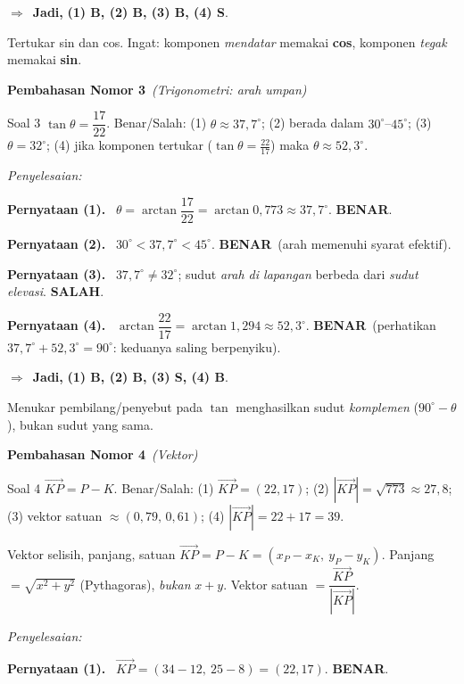 \documentclass[11pt,a4paper]{article}
\newcommand{\jawab}{\par\smallskip\noindent\textit{\textcolor{oranye}{Penyelesaian:}}\par\smallskip}
\newcommand{\jadi}{\par\smallskip\noindent$\Rightarrow$\ \textbf{Jadi, }}
\newcommand{\benar}{\textbf{\textcolor{hijau}{BENAR}}}
\newcommand{\salah}{\textbf{\textcolor{merah}{SALAH}}}
\newcommand{\pernyataan}[1]{\par\smallskip\noindent\textbf{Pernyataan (#1).}\ }
\newcommand{\nomorjudul}[2]{\par\bigskip\noindent%
  {\large\bfseries\color{ungu}Pembahasan Nomor #1}\ {\normalfont\itshape\color{gray}(#2)}\par\nopagebreak\smallskip}
\begin{document}
\jadi \textbf{(1) B, (2) B, (3) B, (4) S}.

\begin{jebakan}
Tertukar sin dan cos. Ingat: komponen \emph{mendatar} memakai \textbf{cos},
komponen \emph{tegak} memakai \textbf{sin}.
\end{jebakan}

\nomorjudul{3}{Trigonometri: arah umpan}
\begin{soalbox}{Soal 3}
$\tan\theta=\dfrac{17}{22}$. Benar/Salah: (1) $\theta\approx37{,}7^\circ$;
(2) berada dalam $30^\circ$--$45^\circ$; (3) $\theta=32^\circ$;
(4) jika komponen tertukar ($\tan\theta=\tfrac{22}{17}$) maka $\theta\approx52{,}3^\circ$.
\end{soalbox}

\jawab
\pernyataan{1} $\theta=\arctan\dfrac{17}{22}=\arctan0{,}773\approx37{,}7^\circ$. \benar.

\pernyataan{2} $30^\circ<37{,}7^\circ<45^\circ$. \benar\ (arah memenuhi syarat efektif).

\pernyataan{3} $37{,}7^\circ\neq32^\circ$; sudut \emph{arah di lapangan} berbeda dari
\emph{sudut elevasi}. \salah.

\pernyataan{4} $\arctan\dfrac{22}{17}=\arctan1{,}294\approx52{,}3^\circ$. \benar\
(perhatikan $37{,}7^\circ+52{,}3^\circ=90^\circ$: keduanya saling berpenyiku).

\jadi \textbf{(1) B, (2) B, (3) S, (4) B}.

\begin{jebakan}
Menukar pembilang/penyebut pada $\tan$ menghasilkan sudut \emph{komplemen}
($90^\circ-\theta$), bukan sudut yang sama.
\end{jebakan}

\nomorjudul{4}{Vektor}
\begin{soalbox}{Soal 4}
$\vec{KP}=P-K$. Benar/Salah: (1) $\vec{KP}=(22,17)$; (2) $|\vec{KP}|=\sqrt{773}\approx27{,}8$;
(3) vektor satuan $\approx(0{,}79,\,0{,}61)$; (4) $|\vec{KP}|=22+17=39$.
\end{soalbox}

\begin{ingat}{Vektor selisih, panjang, satuan}
$\vec{KP}=P-K=(x_P-x_K,\ y_P-y_K)$. Panjang $=\sqrt{x^2+y^2}$ (Pythagoras),
\emph{bukan} $x+y$. Vektor satuan $=\dfrac{\vec{KP}}{|\vec{KP}|}$.
\end{ingat}

\jawab
\pernyataan{1} $\vec{KP}=(34-12,\ 25-8)=(22,17)$. \benar.
\end{document}
